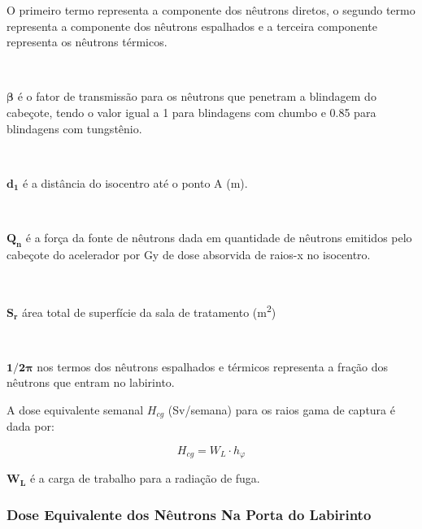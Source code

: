 \documentclass[11pt,a4paper]{article}
\newcounter{exemplo}
\begin{document}
        \begin{exemplo}[onde:]
                O primeiro termo representa a componente dos nêutrons diretos, o segundo termo representa a componente dos nêutrons espalhados e a terceira componente representa os nêutrons térmicos.

                \

                \textcolor{CarnationPink}{$\mathbf{\beta}$} é o fator de transmissão para os nêutrons que penetram a blindagem do cabeçote, tendo o valor igual a 1 para blindagens com chumbo e 0.85 para blindagens com tungstênio.

                \

                \textcolor{CarnationPink}{$\mathbf{d_1}$} é a distância do isocentro até o ponto A (m).

                \

                \textcolor{CarnationPink}{$\mathbf{Q_n}$} é a força da fonte de nêutrons dada em quantidade de nêutrons emitidos pelo cabeçote do acelerador por Gy de dose absorvida de raios-x no isocentro.

                \

                \textcolor{CarnationPink}{$\mathbf{S_r}$} área total de superfície  da sala de tratamento (\unit{m^2})

                \

                \textcolor{CarnationPink}{$\mathbf{1/2\pi}$} nos termos dos nêutrons espalhados e térmicos representa a fração dos nêutrons que entram no labirinto.
        \end{exemplo}

        A dose equivalente semanal $H_{cg}$ (Sv/semana) para os raios gama de captura é dada por:

            \begin{equation}
                H_{cg} = W_L \cdot h_{\varphi}
                \label{eq:doseEquivalenteRaiosGamaCaptura}
            \end{equation}

        \begin{exemplo}[onde:]
            \textcolor{CarnationPink}{$\mathbf{W_L}$} é a carga de trabalho para a radiação de fuga.
        \end{exemplo}

    \subsubsection{Dose Equivalente dos Nêutrons Na Porta do Labirinto}
\end{document}
